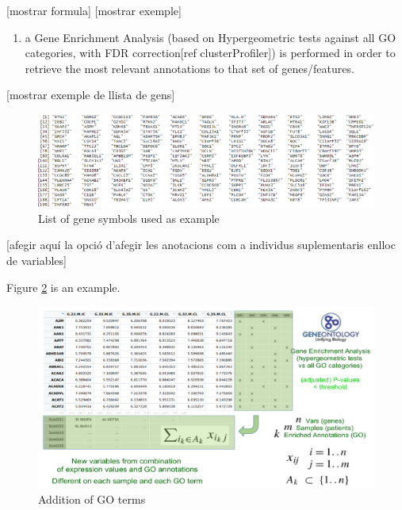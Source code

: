 \documentclass[a4paper, nobind]{templates/ociamthesis}
\providecommand{\tightlist}{%
  \setlength{\itemsep}{0pt}\setlength{\parskip}{0pt}}
\begin{document}
{[}mostrar formula{]} {[}mostrar exemple{]}

\begin{enumerate}
\def\labelenumi{(\roman{enumi})}
\setcounter{enumi}{1}
\tightlist
\item
  a Gene Enrichment Analysis (based on Hypergeometric tests against all GO categories, with FDR correction{[}ref clusterProfiler{]}) is performed in order to retrieve the most relevant annotations to that set of genes/features.
\end{enumerate}

{[}mostrar exemple de llista de gens{]}

\begin{figure}

{\centering \includegraphics[width=0.95\linewidth]{figures/chapter3/3-8_gene_list} 

}

\caption{List of gene symbols used as example}\label{fig:fig3-8}
\end{figure}

{[}afegir aquí la opció d'afegir les anotacions com a individus suplementaris enlloc de variables{]}

Figure \ref{fig:fig3-1} is an example.

\begin{figure}

{\centering \includegraphics[width=0.95\linewidth]{figures/chapter3/3-1_addition_of_GO_terms} 

}

\caption{Addition of GO terms}\label{fig:fig3-1}
\end{figure}
\end{document}
